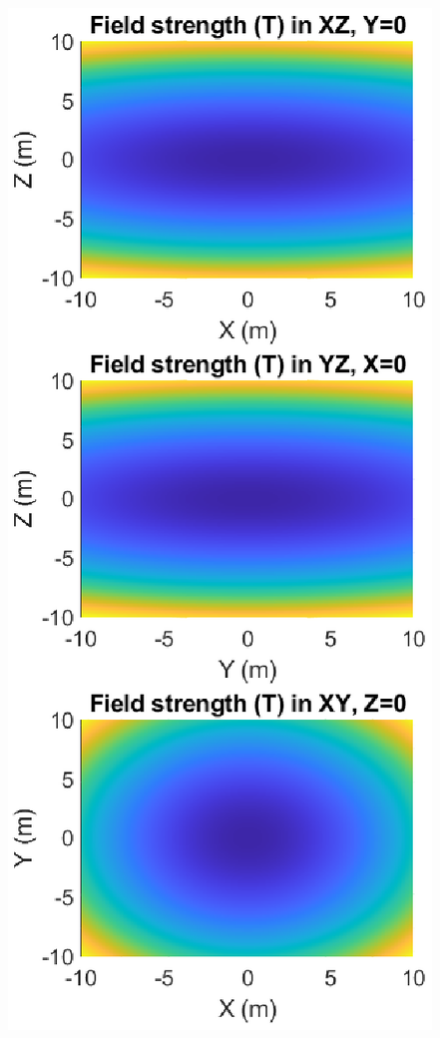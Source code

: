 \documentclass{article}
\theoremstyle{definition}
\begin{document}
\begin{figure}[!htb]
\begin{minipage}{.49\textwidth}
		\includegraphics[width=\linewidth]{sim-figs/TOP-1.eps}

\end{minipage}
\end{figure}
\end{document}
